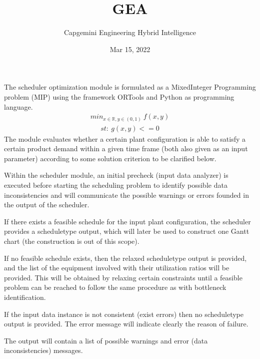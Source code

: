 \documentclass[letterpaper,10pt,english]{sphinxmanual}
\title{GEA}
\date{Mar 15, 2022}
\author{Capgemini Engineering \sphinxhyphen{} Hybrid Intelligence}
\let\sphinxpxdimen\pdfpxdimen\else\newdimen\sphinxpxdimen
\begin{document}
\pagestyle{empty}
\sphinxmaketitle
\pagestyle{plain}
\sphinxtableofcontents
\pagestyle{normal}
\label{\detokenize{index::doc}}


\noindent\sphinxincludegraphics[width=500\sphinxpxdimen]{{logos}.png}

\sphinxAtStartPar
The scheduler optimization module is formulated as a Mixed\sphinxhyphen{}Integer Programming problem (MIP) using the framework ORTools and Python as programming
language.
\begin{equation*}
\begin{split}min_{x \in \mathbb{R}, y \in (0,1)} \ f(x,y)\end{split}
\end{equation*}\begin{equation*}
\begin{split}st: \ g(x,y) <=0\end{split}
\end{equation*}
\sphinxAtStartPar
The module evaluates whether a certain plant configuration is able to satisfy a certain product demand within a given time frame (both also given as an input parameter)
according to some solution criterion to be clarified below.

\sphinxAtStartPar
Within the  scheduler module, an initial pre\sphinxhyphen{}check (input data analyzer) is executed before starting the scheduling problem to identify
possible data inconsistencies and will communicate the possible warnings or errors founded in the output of the scheduler.

\sphinxAtStartPar
If there exists a feasible schedule for the input plant configuration, the scheduler provides a schedule\sphinxhyphen{}type output, which will later be used
to construct one Gantt chart (the construction is out of this scope).

\sphinxAtStartPar
If no feasible schedule exists, then the relaxed schedule\sphinxhyphen{}type output is provided, and the list of the equipment involved with their utilization
ratios will be provided. This will be obtained  by relaxing certain constraints until a feasible problem can be reached to follow the same procedure
as with bottleneck identification.

\sphinxAtStartPar
If the input data instance is not consistent (exist errors) then no schedule\sphinxhyphen{}type output is provided. The error message will indicate clearly the
reason of failure.

\sphinxAtStartPar
The output will contain a list of possible warnings and error (data inconsistencies) messages.
\end{document}
